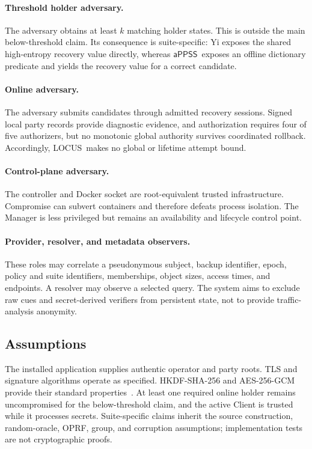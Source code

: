 \documentclass[sigconf,anonymous]{acmart}
\newcommand{\LOCUS}{\textsf{LOCUS}}
\newcommand{\APPSS}{\ensuremath{\mathsf{aPPSS}}}
\begin{document}
\paragraph{Threshold holder adversary.}
The adversary obtains at least \(k\) matching holder states. This is outside
the main below-threshold claim. Its consequence is suite-specific: Yi exposes
the shared high-entropy recovery value directly, whereas \APPSS\ exposes an
offline dictionary predicate and yields the recovery value for a correct
candidate.

\paragraph{Online adversary.}
The adversary submits candidates through admitted recovery sessions. Signed
local party records provide diagnostic evidence, and authorization requires
four of five authorizers, but no monotonic global authority survives
coordinated rollback. Accordingly, \LOCUS\ makes no global or lifetime attempt
bound.

\paragraph{Control-plane adversary.}
The controller and Docker socket are root-equivalent trusted infrastructure.
Compromise can subvert containers and therefore defeats process isolation.
The Manager is less privileged but remains an availability and lifecycle
control point.

\paragraph{Provider, resolver, and metadata observers.}
These roles may correlate a pseudonymous subject, backup identifier, epoch,
policy and suite identifiers, memberships, object sizes, access times, and
endpoints. A resolver may observe a selected query. The system aims to exclude
raw cues and secret-derived verifiers from persistent state, not to provide
traffic-analysis anonymity.

\subsection{Assumptions}

The installed application supplies authentic operator and party roots. TLS
and signature algorithms operate as specified. HKDF-SHA-256 and AES-256-GCM
provide their standard properties~\cite{HKDF2010,RFC5116AEAD}. At least one
required online holder remains uncompromised for the below-threshold claim,
and the active Client is trusted while it processes secrets. Suite-specific
claims inherit the source construction, random-oracle, OPRF, group, and
corruption assumptions; implementation tests are not cryptographic proofs.
\end{document}
